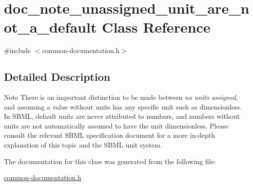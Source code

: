 \hypertarget{classdoc__note__unassigned__unit__are__not__a__default}{}\section{doc\+\_\+note\+\_\+unassigned\+\_\+unit\+\_\+are\+\_\+not\+\_\+a\+\_\+default Class Reference}
\label{classdoc__note__unassigned__unit__are__not__a__default}


{\ttfamily \#include $<$common-\/documentation.\+h$>$}



\subsection{Detailed Description}
\begin{DoxyNote}{Note}
There is an important distinction to be made between {\itshape no units assigned}, and assuming a value without units has any specific unit such as {\ttfamily dimensionless}. In S\+B\+ML, default units are never attributed to numbers, and numbers without units are not automatically assumed to have the unit {\ttfamily dimensionless}. Please consult the relevant S\+B\+ML specification document for a more in-\/depth explanation of this topic and the S\+B\+ML unit system. 
\end{DoxyNote}


The documentation for this class was generated from the following file\+:\begin{DoxyCompactItemize}
\item 
\hyperlink{common-documentation_8h}{common-\/documentation.\+h}\end{DoxyCompactItemize}
